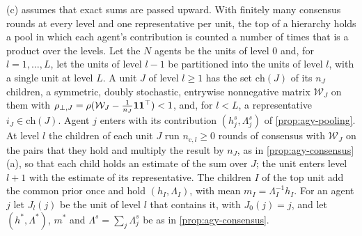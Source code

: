 (c) assumes that exact sums are passed upward. With finitely many consensus rounds at every level and one representative per unit, the top of a hierarchy holds a pool in which each agent's contribution is counted a number of times that is a product over the levels. Let the $N$ agents be the units of level $0$ and, for $l=1,\dots,L$, let the units of level $l-1$ be partitioned into the units of level $l$, with a single unit at level $L$. A unit $J$ of level $l\ge1$ has the set $\mathrm{ch}(J)$ of its $n_J$ children, a symmetric, doubly stochastic, entrywise nonnegative matrix $\mathcal W_J$ on them with $\rho_{\perp,J}=\rho(\mathcal W_J-\frac1{n_J}\mathbf{1}\mathbf{1}^\top)<1$, and, for $l<L$, a representative $i_J\in\mathrm{ch}(J)$. Agent $j$ enters with its contribution $(h^s_j,\Lambda^s_j)$ of \cref{prop:agy-pooling}. At level $l$ the children of each unit $J$ run $n_{\mathrm c,l}\ge0$ rounds of consensus with $\mathcal W_J$ on the pairs that they hold and multiply the result by $n_J$, as in \cref{prop:agy-consensus}(a), so that each child holds an estimate of the sum over $J$; the unit enters level $l+1$ with the estimate of its representative. The children $I$ of the top unit add the common prior once and hold $(h_I,\Lambda_I)$, with mean $m_I=\Lambda_I^{-1}h_I$. For an agent $j$ let $J_l(j)$ be the unit of level $l$ that contains it, with $J_0(j)=j$, and let $(h^\ast,\Lambda^\ast)$, $m^\ast$ and $\Lambda^s=\sum_j\Lambda^s_j$ be as in \cref{prop:agy-consensus}.

